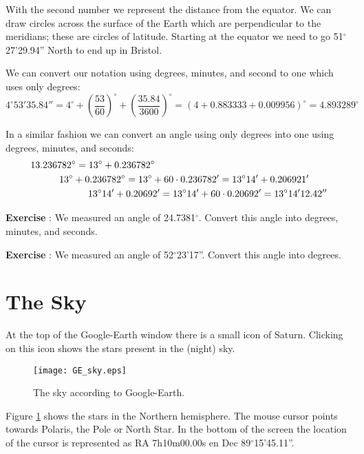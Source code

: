 With the second number we represent the distance from the equator. We can draw circles across the surface of the Earth which are perpendicular to the meridians; these are circles of latitude. Starting at the equator we need to go 51$^{\circ}$27'29.94'' North to end up in Bristol.

We can convert our notation using degrees, minutes, and second to one which uses only degrees:
\begin{equation*}
4^{\circ}53'35.84'' = 4^{\circ} + \left( \frac{53}{60} \right)^{\circ} + \left( \frac{35.84}{3600} \right)^{\circ} = (4 + 0.883333 + 0.009956)^{\circ} = 4.893289^{\circ}
\end{equation*}

In a similar fashion we can convert an angle using only degrees into one using degrees, minutes, and seconds:
\begin{align*}
& 13.236782^{\circ} = 13^{\circ} + 0.236782^{\circ} \\
& \indent \indent 13^{\circ} + 0.236782^{\circ} = 13^{\circ} + 60 \cdot 0.236782' = 13^{\circ}14' + 0.206921' \\
& \indent \indent \indent \indent 13^{\circ}14' + 0.20692' = 13^{\circ}14' + 60 \cdot 0.20692' = 13^{\circ}14'12.42''
\end{align*}

\begin{shaded}
\textbf{Exercise \theExercise {}} : We measured an angle of 24.7381$^{\circ}$. Convert this angle into degrees, minutes, and seconds.\end{shaded}
\begin{shaded}
\textbf{Exercise \theExercise {}} : We measured an angle of 52$^{\circ}$23'17''. Convert this angle into degrees.\end{shaded}

\section{The Sky}
At the top of the Google-Earth window there is a small icon of Saturn. Clicking on this icon shows the stars present in the (night) sky.
\begin{figure}\begin{center}
\texttt{[image: GE\_sky.eps]}
\caption{The sky according to Google-Earth.}\label{fig:GE_sky}
\end{center}\end{figure}

Figure \ref{fig:GE_sky} shows the stars in the Northern hemisphere. The mouse cursor points towards Polaris, the Pole or North Star. In the bottom of the screen the location of the cursor is represented as RA 7h10m00.00s en Dec 89$^{\circ}$15'45.11''. 


